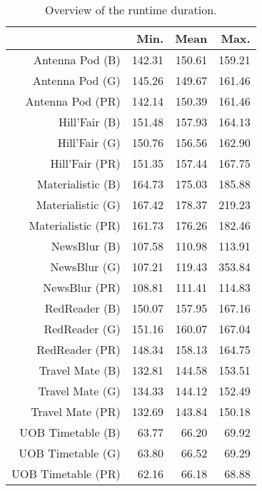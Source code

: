 \begin{table}[ht]
\centering
\begin{tabular}{rrrr}
  \hline
 & Min. & Mean & Max. \\ 
  \hline
Antenna Pod (B) & 142.31 & 150.61 & 159.21 \\ 
  Antenna Pod (G) & 145.26 & 149.67 & 161.46 \\ 
  Antenna Pod (PR) & 142.14 & 150.39 & 161.46 \\ 
  Hill'Fair (B) & 151.48 & 157.93 & 164.13 \\ 
  Hill'Fair (G) & 150.76 & 156.56 & 162.90 \\ 
  Hill'Fair (PR) & 151.35 & 157.44 & 167.75 \\ 
  Materialistic (B) & 164.73 & 175.03 & 185.88 \\ 
  Materialistic (G) & 167.42 & 178.37 & 219.23 \\ 
  Materialistic (PR) & 161.73 & 176.26 & 182.46 \\ 
  NewsBlur (B) & 107.58 & 110.98 & 113.91 \\ 
  NewsBlur (G) & 107.21 & 119.43 & 353.84 \\ 
  NewsBlur (PR) & 108.81 & 111.41 & 114.83 \\ 
  RedReader (B) & 150.07 & 157.95 & 167.16 \\ 
  RedReader (G) & 151.16 & 160.07 & 167.04 \\ 
  RedReader (PR) & 148.34 & 158.13 & 164.75 \\ 
  Travel Mate (B) & 132.81 & 144.58 & 153.51 \\ 
  Travel Mate (G) & 134.33 & 144.12 & 152.49 \\ 
  Travel Mate (PR) & 132.69 & 143.84 & 150.18 \\ 
  UOB Timetable (B) & 63.77 & 66.20 & 69.92 \\ 
  UOB Timetable (G) & 63.80 & 66.52 & 69.29 \\ 
  UOB Timetable (PR) & 62.16 & 66.18 & 68.88 \\ 
   \hline
\end{tabular}
\caption{Overview of the runtime duration.} 
\label{tab:results:rq1:summary:duration}
\end{table}
